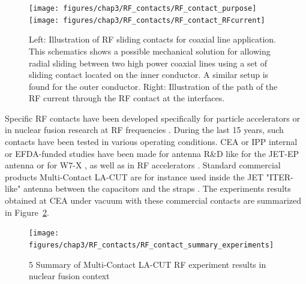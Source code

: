 {\begin{figure}[h]
	\centering
	\texttt{[image: figures/chap3/RF\_contacts/RF\_contact\_purpose]}
	\texttt{[image: figures/chap3/RF\_contacts/RF\_contact\_RFcurrent]}
	\caption{Left: Illustration of RF sliding contacts for coaxial line application. This schematics shows a possible mechanical solution for allowing radial sliding between two high power coaxial lines using a set of sliding contact located on the inner conductor. A similar setup is found for the outer conductor. Right: Illustration of the path of the RF current through the RF contact at the interfaces.}
	\label{fig:rfcontactpurpose}
\end{figure}

%


Specific RF contacts have been developed specifically for particle accelerators  or in nuclear fusion research at RF frequencies  . During the last 15 years, such contacts have been tested in various operating conditions. CEA or IPP internal or EFDA-funded studies have been made for antenna R\&D like for the JET-EP antenna or for W7-X , as well as in RF accelerators . Standard commercial products Multi-Contact LA-CUT are for instance used inside the JET "ITER-like" antenna between the capacitors and the straps . The experiments results obtained at CEA under vacuum with these commercial contacts are summarized in Figure~\ref{fig:rfcontactsummaryexperiments}.



\begin{figure}[h]
	\centering
	\texttt{[image: figures/chap3/RF\_contacts/RF\_contact\_summary\_experiments]}
	\caption{5 Summary of Multi-Contact LA-CUT RF experiment results in nuclear fusion context}
	\label{fig:rfcontactsummaryexperiments}
\end{figure}

}
